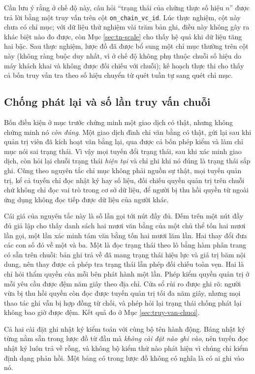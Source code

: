 Cần lưu ý rằng ở chế độ này, câu hỏi ``trạng thái của chứng thực số hiệu $n$'' được trả lời bằng một truy vấn trên cột \texttt{on\_chain\_vc\_id}. Lúc thực nghiệm, cột này chưa có chỉ mục; với dữ liệu thử nghiệm vài trăm bản ghi, điều này không gây ra khác biệt nào đo được, còn Mục \ref{sec:tn-scale} cho thấy hệ quả khi dữ liệu tăng hai bậc. Sau thực nghiệm, lược đồ đã được bổ sung một chỉ mục thường trên cột này (không ràng buộc duy nhất, vì ở chế độ không phụ thuộc chuỗi số hiệu do máy khách khai và không được đối chiếu với chuỗi); kế hoạch thực thi cho thấy cả bốn truy vấn tra theo số hiệu chuyển từ quét tuần tự sang quét chỉ mục.

\subsection{Chống phát lại và số lần truy vấn chuỗi}

Bốn điều kiện ở mục trước chứng minh một giao dịch có thật, nhưng không chứng minh nó \emph{còn đúng}. Một giao dịch đình chỉ văn bằng có thật, gửi lại sau khi quản trị viên đã kích hoạt văn bằng lại, qua được cả bốn phép kiểm và làm chỉ mục nói sai trạng thái. Vì vậy mọi tuyến đổi trạng thái, sau khi xác minh giao dịch, còn hỏi lại chuỗi trạng thái \emph{hiện tại} và chỉ ghi khi nó đúng là trạng thái sắp ghi. Cũng theo nguyên tắc chỉ mục không phải nguồn sự thật, mọi tuyến quản trị, kể cả tuyến chỉ đọc nhật ký hay số liệu, đối chiếu quyền quản trị trên chuỗi chứ không chỉ đọc vai trò trong cơ sở dữ liệu, để người bị thu hồi quyền từ ngoài ứng dụng không đọc tiếp được dữ liệu của người khác.

Cái giá của nguyên tắc này là số lần gọi tới nút đầy đủ. Đếm trên một nút đầy đủ giả lập cho thấy danh sách hai mươi văn bằng của một chủ thể tốn hai mươi lần gọi, một lần xác minh tám văn bằng tốn hai mươi lăm lần. Hai thay đổi đưa các con số đó về một và ba. Một là đọc trạng thái theo lô bằng hàm phân trang có sẵn trên chuỗi: bản ghi trả về đã mang trạng thái hiệu lực và giá trị băm nội dung, nên thay được cả phép tra trạng thái lẫn phép đối chiếu toàn vẹn. Hai là chỉ hỏi thẩm quyền của mỗi bên phát hành một lần. Phép kiểm quyền quản trị ở mỗi yêu cầu được đệm năm giây theo địa chỉ. Cửa sổ rủi ro được ghi rõ: người vừa bị thu hồi quyền còn đọc được tuyến quản trị tối đa năm giây, nhưng mọi thao tác ghi vẫn bị hợp đồng từ chối, và phép hỏi lại trạng thái chống phát lại không bao giờ được đệm. Kết quả đo ở Mục \ref{sec:truy-van-chuoi}.

Cả hai cài đặt ghi nhật ký kiểm toán với cùng bộ tên hành động. Bảng nhật ký từng nằm sẵn trong lược đồ từ đầu mà \emph{không cài đặt nào ghi vào}, nên tuyến đọc nhật ký luôn trả về rỗng, và không bộ kiểm thử nào phát hiện vì chúng chỉ kiểm định dạng phản hồi. Một bảng có trong lược đồ không có nghĩa là có ai ghi vào nó.

